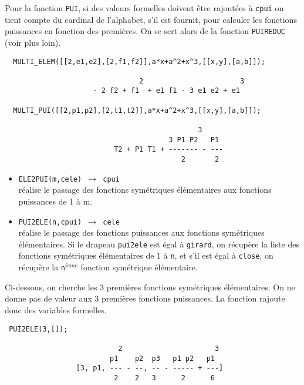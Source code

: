 \documentclass[11pt]{article}
\begin{document}
Pour la fonction {\tt PUI}, si des valeurs formelles doivent
\^{e}tre rajout\'{e}es \`{a}
{\tt cpui} on tient compte du cardinal de l'alphabet, s'il est
fournit, pour calculer les fonctions puissances en fonction des 
premi\`{e}res. On se sert alors de la fonction {\tt PUIREDUC} (voir
plus loin).
\small
\begin{verbatim}
  MULTI_ELEM([[2,e1,e2],[2,f1,f2]],a*x+a^2+x^3,[[x,y],[a,b]]);

                                2                       3
                     - 2 f2 + f1  + e1 f1 - 3 e1 e2 + e1

  MULTI_PUI([[2,p1,p2],[2,t1,t2]],a*x+a^2+x^3,[[x,y],[a,b]]);
    
                                              3
                                       3 P1 P2   P1
                          T2 + P1 T1 + ------- - ---
                                          2       2
\end{verbatim}
\normalsize
\begin{itemize}
\item {\tt ELE2PUI(m,cele) 
$\longrightarrow$ cpui}\\
 r\'{e}alise le passage des fonctions 
sym\'{e}triques 
\'{e}l\'{e}mentaires aux fonctions puissances de 1 \`{a} m.

\item {\tt PUI2ELE(n,cpui) 
$\longrightarrow$ cele}\\
 r\'{e}alise le passage des fonctions 
puissances aux fonctions 
sym\'{e}triques \'{e}l\'{e}mentaires. Si le drapeau {\tt pui2ele} est
\'egal \`a 
{\tt girard}, on r\'ecup\`ere la liste des fonctions sym\'etriques
\'el\'ementaires de 1 \`{a} {\tt n}, et s'il est \'egal \`a {\tt close}, on
r\'ecup\`ere la {\tt n}$^{i\grave{e}me}$ fonction sym\'etrique
\'el\'ementaire.
\end{itemize}
Ci-dessous, on cherche les 3 premi\`{e}res fonctions sym\'{e}triques 
\'{e}l\'{e}mentaires.
   On ne donne pas de valeur aux 3 premi\`{e}res fonctions puissances. La
   fonction rajoute donc des variables formelles.
\small
\begin{verbatim}
 PUI2ELE(3,[]);

                           2                      3
                         p1    p2  p3   p1 p2   p1
                 [3, p1, --- - --, -- - ----- + ---]
                          2    2   3      2      6


\end{verbatim}
\normalsize
\end{document}
